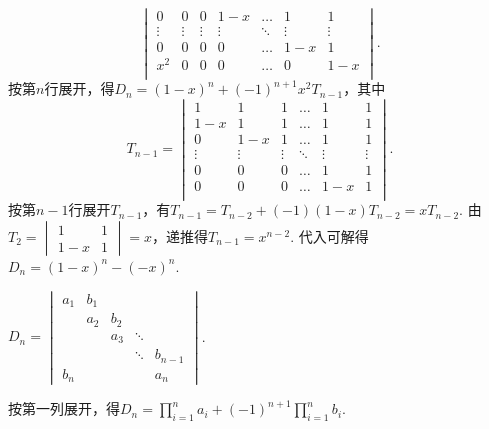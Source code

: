 \begin{exercise}
\begin{exgroup}
\begin{answer}
\[\begin{vmatrix}
                    0      & 0      & 0      & 1-x    & \ldots & 1      & 1      \\
                    \vdots & \vdots & \vdots & \vdots & \ddots & \vdots & \vdots \\
                    0      & 0      & 0      & 0      & \ldots & 1-x    & 1      \\
                    x^2    & 0      & 0      & 0      & \ldots & 0      & 1-x    \\
                \end{vmatrix}.\]
            按第$n$行展开，得$D_n=(1-x)^n+(-1)^{n+1}x^2T_{n-1}$，其中
            \[T_{n-1}=\begin{vmatrix}
                    1      & 1      & 1      & \ldots & 1      & 1      \\
                    1-x    & 1      & 1      & \ldots & 1      & 1      \\
                    0      & 1-x    & 1      & \ldots & 1      & 1      \\
                    \vdots & \vdots & \vdots & \ddots & \vdots & \vdots \\
                    0      & 0      & 0      & \ldots & 1      & 1      \\
                    0      & 0      & 0      & \ldots & 1-x    & 1      \\
                \end{vmatrix}.\]
            按第$n-1$行展开$T_{n-1}$，有$T_{n-1}=T_{n-2}+(-1)(1-x)T_{n-2}=xT_{n-2}$. 由$T_2=\begin{vmatrix}
                    1&1\\1-x&1\end{vmatrix}=x$，递推得$T_{n-1}=x^{n-2}$. 代入可解得$D_n=(1-x)^n-(-x)^n$.
        \end{answer}

        \item $ D_n=\begin{vmatrix}
                a_1 & b_1 &     &        &         \\
                    & a_2 & b_2 &        &         \\
                    &     & a_3 & \ddots &         \\
                    &     &     & \ddots & b_{n-1} \\
                b_n &     &     &        & a_n
            \end{vmatrix}$.
        \begin{answer}
            按第一列展开，得$D_n=\displaystyle\prod_{i=1}^na_i+(-1)^{n+1}\prod_{i=1}^nb_i$.
        \end{answer}


\end{exgroup}
\end{exercise}
